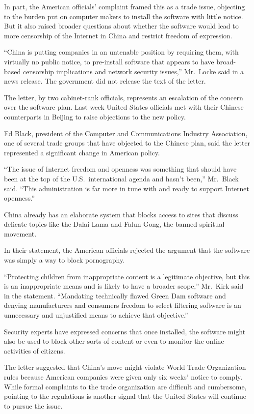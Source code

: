 ﻿\documentclass[12pt]{article}
\begin{document}
In part, the American officials' complaint framed this as a trade issue, objecting to the burden put
on computer makers to install the software with little notice. But it also raised broader questions
about whether the software would lead to more censorship of the Internet in China and restrict
freedom of expression.

``China is putting companies in an untenable position by requiring them, with virtually no public
notice, to pre-install software that appears to have broad-based censorship implications and network
security issues,'' Mr.~Locke said in a news release. The government did not release the text of the
letter.

The letter, by two cabinet-rank officials, represents an escalation of the concern over the software
plan. Last week United States officials met with their Chinese counterparts in Beijing to raise
objections to the new policy.

Ed Black, president of the Computer and Communications Industry Association, one of several trade
groups that have objected to the Chinese plan, said the letter represented a significant change in
American policy.

``The issue of Internet freedom and openness was something that should have been at the top of the
U.S.~international agenda and hasn't been,'' Mr.~Black said. ``This administration is far more in
tune with and ready to support Internet openness.''

China already has an elaborate system that blocks access to sites that discuss delicate topics like
the Dalai Lama and Falun Gong, the banned spiritual movement.

In their statement, the American officials rejected the argument that the software was simply a way
to block pornography.

``Protecting children from inappropriate content is a legitimate objective, but this is an
inappropriate means and is likely to have a broader scope,'' Mr.~Kirk said in the statement.
``Mandating technically flawed Green Dam software and denying manufacturers and consumers freedom to
select filtering software is an unnecessary and unjustified means to achieve that objective.''

Security experts have expressed concerns that once installed, the software might also be used to
block other sorts of content or even to monitor the online activities of citizens.

The letter suggested that China's move might violate World Trade Organization rules because American
companies were given only six weeks' notice to comply. While formal complaints to the trade
organization are difficult and cumbersome, pointing to the regulations is another signal that the
United States will continue to pursue the issue.
\end{document}
